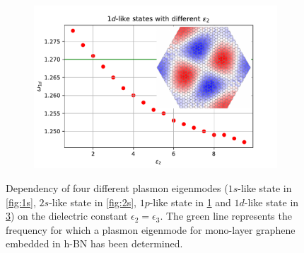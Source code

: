 \begin{figure}[H]
\begin{subfigure}[b]{.49\textwidth}
  \caption{}
  \label{fig:1p}
\end{subfigure}
\hfill
\begin{subfigure}[b]{.49\textwidth}
  \centering
  \includegraphics[width=\textwidth]{img/1d.pdf}
  \caption{}
  \label{fig:1d}
\end{subfigure}
\caption{Dependency of four different plasmon eigenmodes ($1s$-like state in \ref{fig:1s}, $2s$-like state in \ref{fig:2s}, $1p$-like state in \ref{fig:1p} and $1d$-like state in \ref{fig:1d}) on the dielectric constant $\epsilon_2=\epsilon_3$. The green line represents the frequency for which a plasmon eigenmode for mono-layer graphene embedded in h-BN has been determined.}
\end{figure}

